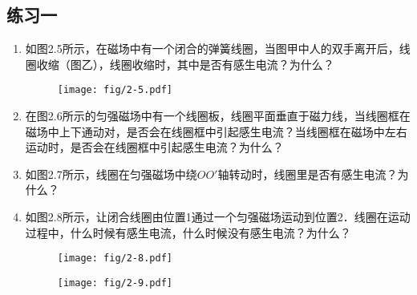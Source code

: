 \subsection*{练习一}
\begin{enumerate}
    \item 如图2.5所示，在磁场中有一个闭合的弹簧线圈，当图甲中人的双手离开后，线圈收缩（图乙），线圈收缩时，其中是否有感生电流？为什么？
\begin{figure}[htp]\centering
\texttt{[image: fig/2-5.pdf]}
\caption{}
\end{figure}

    \item 在图2.6所示的匀强磁场中有一个线圈板，线圈平面垂直于磁力线，当线圈框在磁场中上下通动对，是否会在线圈框中引起感生电流？当线圈框在磁场中左右运动时，是否会在线圈框中引起感生电流？为什么？
\begin{figure}[htp]
\centering
\begin{minipage}[t]{0.48\textwidth}
\centering
{}
\caption{}
\end{minipage}
\begin{minipage}[t]{0.48\textwidth}
\centering
{}
\caption{}
\end{minipage}
\end{figure}

    \item 如图2.7所示，线圈在匀强磁场中绕$OO'$轴转动时，线圈里是否有感生电流？为什么？
    \item 如图2.8所示，让闭合线圈由位置1通过一个匀强磁场运动到位置2．线圈在运动过程中，什么时候有感生电流，什么时候没有感生电流？为什么？
\begin{figure}[htp]
\centering
\begin{minipage}[t]{0.48\textwidth}
\centering
\texttt{[image: fig/2-8.pdf]}
\caption{}
\end{minipage}
\begin{minipage}[t]{0.48\textwidth}
\centering
\texttt{[image: fig/2-9.pdf]}
\caption{}
\end{minipage}
\end{figure}



\end{enumerate}

